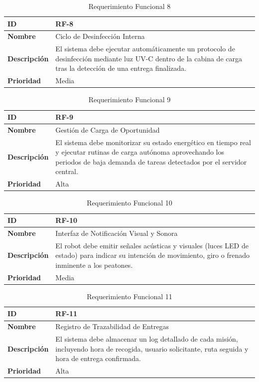 \begin{table}[H]
\centering
\begin{tabular}{|l|p{10cm}|}
\hline
\textbf{ID} & RF-8 \\ \hline
\textbf{Nombre} & Ciclo de Desinfección Interna \\ \hline
\textbf{Descripción} & El sistema debe ejecutar automáticamente un protocolo de desinfección mediante luz UV-C dentro de la cabina de carga tras la detección de una entrega finalizada. \\ \hline
\textbf{Prioridad} & Media \\ \hline
\end{tabular}
\caption{Requerimiento Funcional 8}
\end{table}

\begin{table}[H]
\centering
\begin{tabular}{|l|p{10cm}|}
\hline
\textbf{ID} & RF-9 \\ \hline
\textbf{Nombre} & Gestión de Carga de Oportunidad \\ \hline
\textbf{Descripción} & El sistema debe monitorizar su estado energético en tiempo real y ejecutar rutinas de carga autónoma aprovechando los periodos de baja demanda de tareas detectados por el servidor central. \\ \hline
\textbf{Prioridad} & Alta \\ \hline
\end{tabular}
\caption{Requerimiento Funcional 9}
\end{table}

\begin{table}[H]
\centering
\begin{tabular}{|l|p{10cm}|}
\hline
\textbf{ID} & RF-10 \\ \hline
\textbf{Nombre} & Interfaz de Notificación Visual y Sonora \\ \hline
\textbf{Descripción} & El robot debe emitir señales acústicas y visuales (luces LED de estado) para indicar su intención de movimiento, giro o frenado inminente a los peatones. \\ \hline
\textbf{Prioridad} & Media \\ \hline
\end{tabular}
\caption{Requerimiento Funcional 10}
\end{table}

\begin{table}[H]
\centering
\begin{tabular}{|l|p{10cm}|}
\hline
\textbf{ID} & RF-11 \\ \hline
\textbf{Nombre} & Registro de Trazabilidad de Entregas \\ \hline
\textbf{Descripción} & El sistema debe almacenar un log detallado de cada misión, incluyendo hora de recogida, usuario solicitante, ruta seguida y hora de entrega confirmada. \\ \hline
\textbf{Prioridad} & Alta \\ \hline
\end{tabular}
\caption{Requerimiento Funcional 11}
\end{table}


